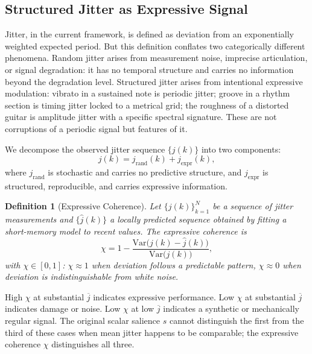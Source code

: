 \documentclass[12pt, a4paper]{article}
\newtheorem{definition}{Definition}
\begin{document}
\subsection{Structured Jitter as Expressive Signal}

Jitter, in the current framework, is defined as deviation from an exponentially weighted expected period. But this definition conflates two categorically different phenomena. Random jitter arises from measurement noise, imprecise articulation, or signal degradation: it has no temporal structure and carries no information beyond the degradation level. Structured jitter arises from intentional expressive modulation: vibrato in a sustained note is periodic jitter; groove in a rhythm section is timing jitter locked to a metrical grid; the roughness of a distorted guitar is amplitude jitter with a specific spectral signature. These are not corruptions of a periodic signal but features of it.

We decompose the observed jitter sequence $\{j(k)\}$ into two components:
\begin{equation}
j(k) = j_{\mathrm{rand}}(k) + j_{\mathrm{expr}}(k),
\label{eq:jdecomp}
\end{equation}
where $j_{\mathrm{rand}}$ is stochastic and carries no predictive structure, and $j_{\mathrm{expr}}$ is structured, reproducible, and carries expressive information.

\begin{definition}[Expressive Coherence]
Let $\{j(k)\}_{k=1}^N$ be a sequence of jitter measurements and $\{\hat{j}(k)\}$ a locally predicted sequence obtained by fitting a short-memory model to recent values. The \emph{expressive coherence} is
\begin{equation}
\chi = 1 - \frac{\mathrm{Var}\bigl(j(k) - \hat{j}(k)\bigr)}{\mathrm{Var}\bigl(j(k)\bigr)},
\label{eq:chi}
\end{equation}
with $\chi \in [0, 1]$: $\chi \approx 1$ when deviation follows a predictable pattern, $\chi \approx 0$ when deviation is indistinguishable from white noise.
\end{definition}

High $\chi$ at substantial $\overline{j}$ indicates expressive performance. Low $\chi$ at substantial $\overline{j}$ indicates damage or noise. Low $\chi$ at low $\overline{j}$ indicates a synthetic or mechanically regular signal. The original scalar salience $s$ cannot distinguish the first from the third of these cases when mean jitter happens to be comparable; the expressive coherence $\chi$ distinguishes all three.
\end{document}
